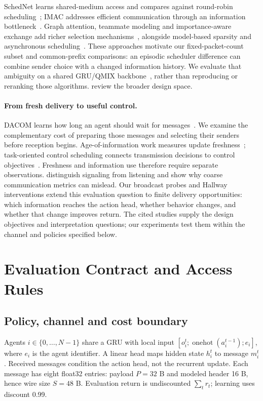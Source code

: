\documentclass[10pt]{article}
\begin{document}
SchedNet learns shared-medium access and compares against round-robin scheduling~\citep{kim2019schedule}; IMAC addresses efficient communication through an information bottleneck~\citep{wang2020imac}. Graph attention, teammate modeling and importance-aware exchange add richer selection mechanisms~\citep{liu2020game,yuan2022incentive,huang2024qmnet}, alongside model-based sparsity and asynchronous scheduling~\citep{han2023model,han2025sparse,srinivasan2025asynchronous}. These approaches motivate our fixed-packet-count subset and common-prefix comparisons: an episodic scheduler difference can combine sender choice with a changed information history. We evaluate that ambiguity on a shared GRU/QMIX backbone~\citep{rashid2018qmix}, rather than reproducing or reranking those algorithms. \citet{zhu2024survey} review the broader design space.

\paragraph{From fresh delivery to useful control.}
DACOM learns how long an agent should wait for messages~\citep{yuan2023dacom}. We examine the complementary cost of preparing those messages and selecting their senders before reception begins. Age-of-information work measures update freshness~\citep{kaul2012real,liu2022optimizing,gong2022hierarchical,alibotaiken2026freshness}; task-oriented control scheduling connects transmission decisions to control objectives~\citep{ayan2022semantics}. Freshness and information use therefore require separate observations. \citet{lowe2019pitfalls} distinguish signaling from listening and show why coarse communication metrics can mislead. Our broadcast probes and Hallway interventions extend this evaluation question to finite delivery opportunities: which information reaches the action head, whether behavior changes, and whether that change improves return. The cited studies supply the design objectives and interpretation questions; our experiments test them within the channel and policies specified below.

\section{Evaluation Contract and Access Rules}
\subsection{Policy, channel and cost boundary}
Agents $i\in\{0,\ldots,N-1\}$ share a GRU with local input $[o_i^t;\operatorname{onehot}(a_i^{t-1});e_i]$, where $e_i$ is the agent identifier. A linear head maps hidden state $h_i^t$ to message $m_i^t$. Received messages condition the action head, not the recurrent update. Each message has eight float32 entries: payload $P=32$ B and modeled header 16 B, hence wire size $S=48$ B. Evaluation return is undiscounted $\sum_t r_t$; learning uses discount 0.99.
\end{document}
